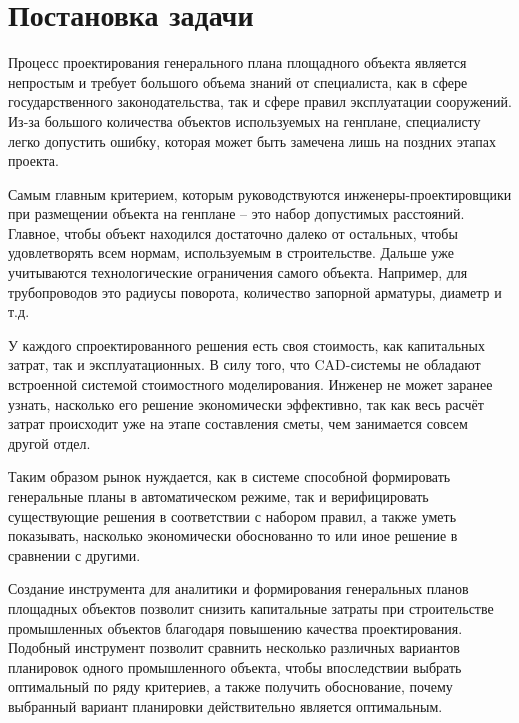 \section*{\Large{Постановка задачи}}


Процесс проектирования генерального плана площадного объекта является непростым
и требует большого объема знаний от специалиста, как в сфере государственного законодательства,
так и сфере правил эксплуатации сооружений.
Из-за большого количества объектов используемых на генплане, специалисту легко допустить ошибку,
которая может быть замечена лишь на поздних этапах проекта.

Самым главным критерием, которым руководствуются инженеры-проектировщики при размещении объекта на генплане -- это
набор допустимых расстояний. Главное, чтобы объект находился достаточно далеко от остальных, чтобы
удовлетворять всем нормам, используемым в строительстве. Дальше уже учитываются технологические ограничения самого
объекта. Например, для трубопроводов это радиусы поворота, количество запорной арматуры, диаметр и т.д.

У каждого спроектированного решения есть своя стоимость, как капитальных затрат, так и эксплуатационных.
В силу того, что CAD-системы не обладают встроенной системой стоимостного моделирования. Инженер не может заранее
узнать, насколько его решение экономически эффективно, так как весь расчёт затрат происходит уже на этапе
составления сметы, чем занимается совсем другой отдел.

Таким образом рынок нуждается, как в системе способной формировать генеральные планы в автоматическом режиме,
так и верифицировать существующие решения в соответствии с набором правил, а также уметь показывать, насколько
экономически обоснованно то или иное решение в сравнении с другими.

Создание инструмента для аналитики и формирования генеральных планов площадных объектов позволит снизить
капитальные затраты при строительстве промышленных объектов благодаря повышению качества проектирования.
Подобный инструмент позволит сравнить несколько различных вариантов планировок одного промышленного объекта,
чтобы впоследствии выбрать оптимальный по ряду критериев, а также получить обоснование,
почему выбранный вариант планировки действительно является оптимальным.


